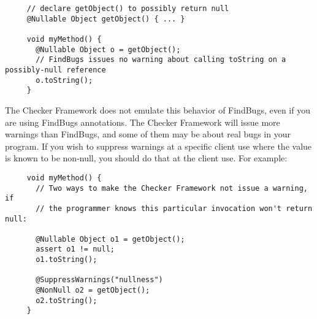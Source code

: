 \begin{Verbatim}
     // declare getObject() to possibly return null
     @Nullable Object getObject() { ... }

     void myMethod() {
       @Nullable Object o = getObject();
       // FindBugs issues no warning about calling toString on a possibly-null reference
       o.toString();
     }
\end{Verbatim}

The Checker Framework does not emulate this behavior of FindBugs, even if
you are using FindBugs annotations.
The Checker Framework will issue more warnings than FindBugs, and some of
them may be about real bugs in your program.
If you wish to suppress warnings at a
specific client use where the value is known to be non-null, you should do that
at the client use.  For example:

\begin{Verbatim}
     void myMethod() {
       // Two ways to make the Checker Framework not issue a warning, if
       // the programmer knows this particular invocation won't return null:

       @Nullable Object o1 = getObject();
       assert o1 != null;
       o1.toString();

       @SuppressWarnings("nullness")
       @NonNull o2 = getObject();
       o2.toString();
     }
\end{Verbatim}



